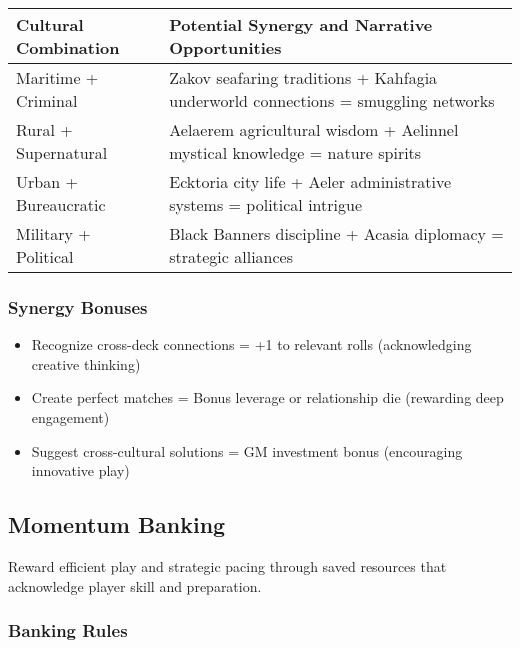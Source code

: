 \begin{fatebox}
\begin{tabularx}{\textwidth}{lX}
\toprule
\textbf{Cultural Combination} & \textbf{Potential Synergy and Narrative Opportunities} \\
\midrule
Maritime + Criminal & Zakov seafaring traditions + Kahfagia underworld connections = smuggling networks \\
Rural + Supernatural & Aelaerem agricultural wisdom + Aelinnel mystical knowledge = nature spirits \\
Urban + Bureaucratic & Ecktoria city life + Aeler administrative systems = political intrigue \\
Military + Political & Black Banners discipline + Acasia diplomacy = strategic alliances \\
\bottomrule
\end{tabularx}
\end{fatebox}

\subsubsection*{Synergy Bonuses}

\begin{itemize}
    \item Recognize cross-deck connections = +1 to relevant rolls (acknowledging creative thinking)
    \item Create perfect matches = Bonus leverage or relationship die (rewarding deep engagement)
    \item Suggest cross-cultural solutions = GM investment bonus (encouraging innovative play)
\end{itemize}

\subsection*{Momentum Banking}

Reward efficient play and strategic pacing through saved resources that acknowledge player skill and preparation.

\subsubsection*{Banking Rules}


